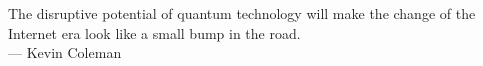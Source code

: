 \thispagestyle{empty}

\vspace*{3cm}

\begin{center}
    The disruptive potential of quantum technology will make the change of the Internet era look like a small bump in the road. \\ \medskip
    --- Kevin Coleman
\end{center}